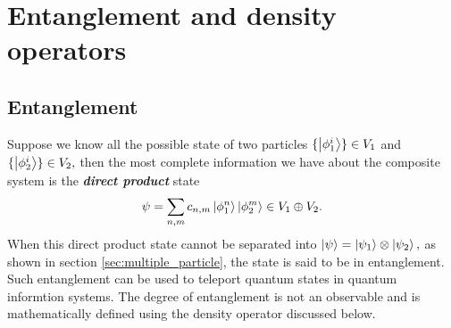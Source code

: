 \documentclass{article}
\theoremstyle{nonumberplain}
\begin{document}
\section{Entanglement and density operators}
\subsection{Entanglement}
Suppose we know all the possible state of two particles $\{\ket{\phi^i_1}\} \in V_1$ and $\{\ket{\phi^i_2}\} \in V_2,$ then the most complete information we have about the composite system is the \textit{\textbf{direct product}} state 
\begin{equation}
    \psi  = \sum_{n,m} c_{n,m} \ket{\phi^n_1} \ket{\phi^m_2} \in V_1 \oplus V_2. \label{eq:direct-product}
\end{equation}
When this direct product state cannot be separated into $\ket{\psi} = \ket{\psi_1} \otimes \ket{\psi_2},$ as shown in section \ref{sec:multiple_particle}, the state is said to be in entanglement. Such entanglement can be used to teleport quantum states in quantum informtion systems. The degree of entanglement is not an observable and is mathematically defined using the density operator discussed below. 
\end{document}
